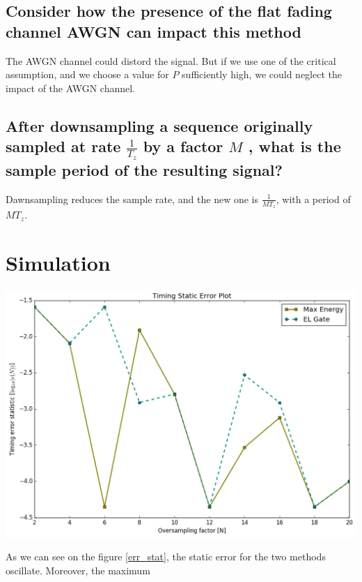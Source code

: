 \documentclass[frenchb, oneside, headings=normal]{scrartcl}
\begin{document}
\subsection{Consider how the presence of the flat fading channel AWGN can impact this method}

The AWGN channel could distord the signal. But if we use one of the critical assumption, and we choose a value for $P$ sufficiently high, we could neglect the impact of the AWGN channel.

\subsection{After downsampling a sequence originally sampled at rate $\frac{1}{T_z}$ by a factor $M$ , what is the sample period of the resulting signal?}

Dawnsampling reduces the sample rate, and the new one is $\frac{1}{MT_z}$, with a period of $MT_z$.

\section{Simulation}

\begin{center}
\includegraphics[width=.9\textwidth]{img/Timing-Static-Error}
\label{err_stat}
\end{center}

As we can see on the figure \ref{err_stat}, the static error for the two methods oscillate. Moreover, the maximum    
\end{document}
